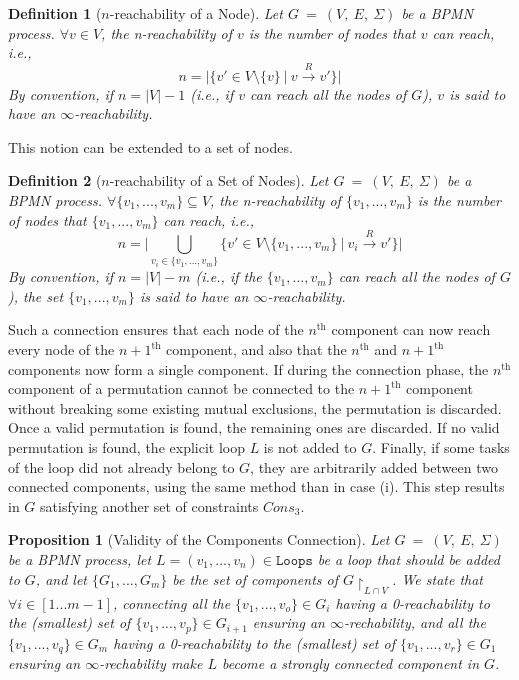 \documentclass{article}
\newcommand{\cardof}[1]{\lvert #1 \rvert}
\newcommand{\closedarray}[2]{[#1...#2]}
\newcommand{\graph}{G~=~(V,~E,~\Sigma)}
\newcommand{\loops}{\ensuremath{\mathtt{Loops}}}
\newcommand{\paramedconstraints}[1]{\mathit{Cons_{#1}}}
\newcommand{\restrictionof}[2]{\ensuremath{#1\restriction_{#2}}}
\newtheorem{definition}{Definition}
\newtheorem{proposition}{Proposition}
\begin{document}
	\begin{definition}[$n$-reachability of a Node]
		Let $\graph$ be a BPMN process.
		$\forall v \in V$, the \textnormal{n-reachability} of $v$ is the number of nodes that $v$ can reach, i.e.,
		\begin{equation*}
			n = \cardof{\{v' \in V \setminus \{v\} \ \vert \ v \xrightarrow{R} v'\}}
		\end{equation*}
		By convention, if $n = \cardof{V} - 1$ (i.e., if $v$ can reach all the nodes of $G$), $v$ is said to have an $\infty$-reachability.
	\end{definition}
	
	This notion can be extended to a set of nodes.
	
	\begin{definition}[$n$-reachability of a Set of Nodes]
		Let $\graph$ be a BPMN process.
		$\forall \{v_1, ..., v_m\} \subseteq V$, the \textnormal{n-reachability} of $\{v_1, ..., v_m\}$ is the number of nodes that $\{v_1, ..., v_m\}$ can reach, i.e.,
		\begin{equation*}
			n = \cardof{\bigcup\limits_{v_i \in \{v_1, ..., v_m\}} \{v' \in V \setminus \{v_1, ..., v_m\} \ \vert \ v_i \xrightarrow{R} v'\}}
		\end{equation*}
		By convention, if $n = \cardof{V} - m$ (i.e., if the $\{v_1, ..., v_m\}$ can reach all the nodes of $G$), the set $\{v_1, ..., v_m\}$ is said to have an $\infty$-reachability.
	\end{definition}
	
	Such a connection ensures that each node of the $n^{\text{th}}$ component can now reach every node of the ${n+1}^{\text{th}}$ component, and also that the $n^{\text{th}}$ and ${n+1}^{\text{th}}$ components now form a single component.
	If during the connection phase, the $n^{\text{th}}$ component of a permutation cannot be connected to the ${n+1}^{\text{th}}$ component without breaking some existing mutual exclusions, the permutation is discarded.
	Once a valid permutation is found, the remaining ones are discarded.
	If no valid permutation is found, the explicit loop $L$ is not added to $G$.
	Finally, if some tasks of the loop did not already belong to $G$, they are arbitrarily added between two connected components, using the same method than in case (i).
	This step results in $G$ satisfying another set of constraints $\paramedconstraints{3}$.
	
	\begin{proposition}[Validity of the Components Connection]
		Let $\graph$ be a BPMN process, let $L = (v_1, ..., v_n) \in \loops$ be a loop that should be added to $G$, and let $\{G_1, ..., G_m\}$ be the set of components of $\restrictionof{G}{L \cap V}$.
		We state that $\forall i \in \closedarray{1}{m-1}$, connecting all the $\{v_1, ..., v_o\} \in G_i$ having a 0-reachability to the (smallest) set of $\{v_1, ..., v_p\} \in G_{i+1}$ ensuring an $\infty$-rechability, and all the $\{v_1, ..., v_q\} \in G_m$ having a 0-reachability to the (smallest) set of $\{v_1, ..., v_r\} \in G_{1}$ ensuring an $\infty$-rechability make $L$ become a strongly connected component in $G$.
	\end{proposition}
	
\end{document}
